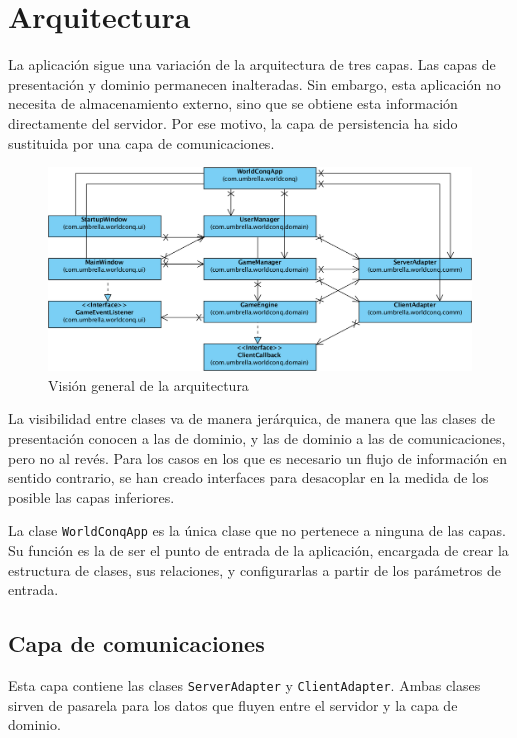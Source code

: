 \chapter{Arquitectura}

La aplicación sigue una variación de la arquitectura de tres capas. Las capas
de presentación y dominio permanecen inalteradas. Sin embargo, esta aplicación
no necesita de almacenamiento externo, sino que se obtiene esta información
directamente del servidor. Por ese motivo, la capa de persistencia ha sido
sustituida por una capa de comunicaciones.

\begin{figure}[h]
\caption{Visión general de la arquitectura}
\centering
\includegraphics[scale=0.4]{img/ch02arch-overview.png}
\end{figure}

La visibilidad entre clases va de manera jerárquica, de manera que las clases
de presentación conocen a las de dominio, y las de dominio a las de
comunicaciones, pero no al revés. Para los casos en los que es necesario un
flujo de información en sentido contrario, se han creado interfaces para
desacoplar en la medida de los posible las capas inferiores.

La clase \texttt{WorldConqApp} es la única clase que no pertenece a ninguna de
las capas. Su función es la de ser el punto de entrada de la aplicación,
encargada de crear la estructura de clases, sus relaciones, y configurarlas a
partir de los parámetros de entrada.

\section{Capa de comunicaciones}

Esta capa contiene las clases \texttt{ServerAdapter} y \texttt{ClientAdapter}.
Ambas clases sirven de pasarela para los datos que fluyen entre el servidor y la
capa de dominio.

